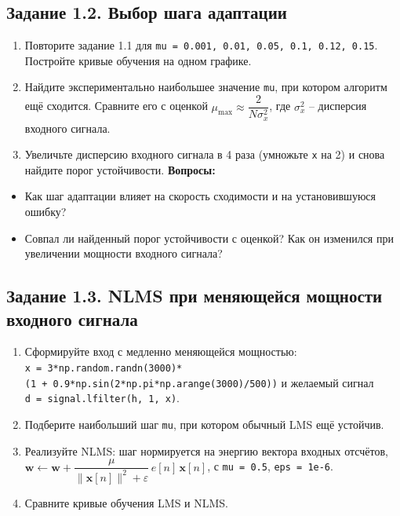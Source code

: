 \documentclass[12pt,a4paper,openany]{book}
\providecommand{\tightlist}{\setlength{\itemsep}{0pt}\setlength{\parskip}{0pt}}
\begin{document}
\subsection*{Задание 1.2. Выбор шага адаптации}

\begin{enumerate}
\def\labelenumi{\arabic{enumi}.}
\tightlist
\item
  Повторите задание 1.1 для \texttt{mu\ =\allowbreak{}\ 0.\allowbreak{}001,\allowbreak{}\ 0.\allowbreak{}01,\allowbreak{}\ 0.\allowbreak{}05,\allowbreak{}\ 0.\allowbreak{}1,\allowbreak{}\ 0.\allowbreak{}12,\allowbreak{}\ 0.\allowbreak{}15}. Постройте кривые обучения на одном графике.
\item
  Найдите экспериментально наибольшее значение \texttt{mu}, при котором алгоритм ещё сходится. Сравните его с оценкой \(\mu_{\max} \approx \dfrac{2}{N\sigma_x^2}\), где \(\sigma_x^2\) -- дисперсия входного сигнала.
\item
  Увеличьте дисперсию входного сигнала в 4 раза (умножьте \texttt{x} на 2) и снова найдите порог устойчивости.
  \textbf{Вопросы:}
\end{enumerate}

\begin{itemize}
\tightlist
\item
  Как шаг адаптации влияет на скорость сходимости и на установившуюся ошибку?
\item
  Совпал ли найденный порог устойчивости с оценкой? Как он изменился при увеличении мощности входного сигнала?
\end{itemize}

\subsection*{Задание 1.3. NLMS при меняющейся мощности входного сигнала}

\begin{enumerate}
\def\labelenumi{\arabic{enumi}.}
\tightlist
\item
  Сформируйте вход с медленно меняющейся мощностью: \texttt{x\ =\allowbreak{}\ 3*np.\allowbreak{}random.\allowbreak{}randn(\allowbreak{}3000)*(\allowbreak{}1\ +\ 0.\allowbreak{}9*np.\allowbreak{}sin(\allowbreak{}2*np.\allowbreak{}pi*np.\allowbreak{}arange(\allowbreak{}3000)/\allowbreak{}500))} и желаемый сигнал \texttt{d\ =\allowbreak{}\ signal.\allowbreak{}lfilter(\allowbreak{}h,\allowbreak{}\ 1,\allowbreak{}\ x)}.
\item
  Подберите наибольший шаг \texttt{mu}, при котором обычный LMS ещё устойчив.
\item
  Реализуйте NLMS: шаг нормируется на энергию вектора входных отсчётов, \(\mathbf{w} \leftarrow \mathbf{w} + \dfrac{\mu}{\|\mathbf{x}[n]\|^2 + \varepsilon}\,e[n]\,\mathbf{x}[n]\), с \texttt{mu\ =\allowbreak{}\ 0.\allowbreak{}5}, \texttt{eps\ =\allowbreak{}\ 1e-6}.
\item
  Сравните кривые обучения LMS и NLMS.
\end{enumerate}
\end{document}
